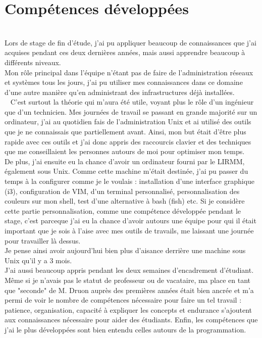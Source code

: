 \documentclass[11pt,french,a4paper]{report}
\begin{document}
    \section{Compétences développées} \\
Lors de stage de fin d'étude, j'ai pu appliquer beaucoup de connaissances que j'ai acquises pendant ces deux dernières années,
mais aussi apprendre beaucoup à différents niveaux.\\
Mon rôle principal dans l'équipe n'étant pas de faire de l'administration réseaux et systèmes tous les jours, 
j'ai pu utiliser mes connaissances dans ce domaine d'une autre manière qu'en administrant des infrastructures déjà installées. \\ 
C'est surtout la théorie qui m'aura été utile, voyant plus le rôle d'un ingénieur que d'un technicien. 
Mes journées de travail se passant en grande majorité sur un ordinateur, j'ai au quotidien fais de l'administration Unix et ai
utilisé des outils que je ne connaissais que partiellement avant. Ainsi, mon but était d'être plus rapide avec ces outils 
et j'ai donc appris des raccourcis clavier et des techniques que me conseillaient les personnes autours de moi pour optimiser 
mon temps. \\
De plus, j'ai ensuite eu la chance d'avoir un ordinateur fourni par le LIRMM, également sous Unix.
Comme cette machine m'était destinée, j'ai pu passer du temps à la configurer comme je le voulais : 
installation d'une interface graphique (i3), configuration de VIM, d'un terminal personnalisé, personnalisation des couleurs 
sur mon shell, test d'une alternative à bash (fish) etc. 
Si je considère cette partie personnalisation, comme une compétence développée pendant le stage, c'est parceque j'ai eu la chance 
d'avoir autours une équipe pour qui il était important que je sois à l'aise avec mes outils de travails, me laissant une 
journée pour travailler là dessus. \\
Je pense ainsi avoir aujourd'hui bien plus d'aisance derrière une machine sous Unix qu'il y a 3 mois. \\
J'ai aussi beaucoup appris pendant les deux semaines d'encadrement d'étudiant. Même si je n'avais pas le statut de professeur 
ou de vacataire, ma place en tant que "seconde" de M. Druon auprès des premières années était bien ancrée 
et m'a permi de voir le nombre de compétences nécessaire pour faire un tel travail : patience, organisation, 
capacité à expliquer les concepts et endurance s'ajoutent aux connaissances nécessaire pour aider des étudiants. 
Enfin, les compétences que j'ai le plus développées sont bien entendu celles autours de la programmation. 
\end{document}
